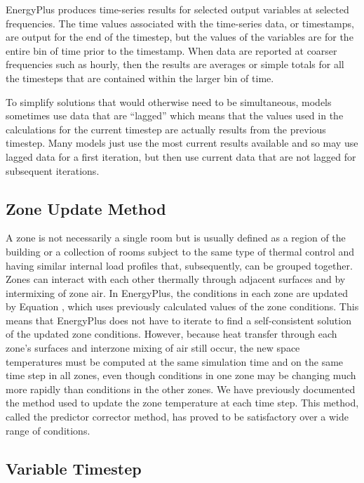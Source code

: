 EnergyPlus produces time-series results for selected output variables at selected frequencies. The time values associated with the time-series data, or timestamps, are output for the end of the timestep, but the values of the variables are for the entire bin of time prior to the timestamp. When data are reported at coarser frequencies such as hourly, then the results are averages or simple totals for all the timesteps that are contained within the larger bin of time.

To simplify solutions that would otherwise need to be simultaneous, models sometimes use data that are ``lagged'' which means that the values used in the calculations for the current timestep are actually results from the previous timestep. Many models just use the most current results available and so may use lagged data for a first iteration, but then use current data that are not lagged for subsequent iterations.

\subsection{Zone Update Method}\label{zone-update-method}

A zone is not necessarily a single room but is usually defined as a region of the building or a collection of rooms subject to the same type of thermal control and having similar internal load profiles that, subsequently, can be grouped together. Zones can interact with each other thermally through adjacent surfaces and by intermixing of zone air. In EnergyPlus, the conditions in each zone are updated by Equation , which uses previously calculated values of the zone conditions. This means that EnergyPlus does not have to iterate to find a self-consistent solution of the updated zone conditions. However, because heat transfer through each zone's surfaces and interzone mixing of air still occur, the new space temperatures must be computed at the same simulation time and on the same time step in all zones, even though conditions in one zone may be changing much more rapidly than conditions in the other zones. We have previously documented the method used to update the zone temperature at each time step. This method, called the predictor corrector method, has proved to be satisfactory over a wide range of conditions.

\subsection{Variable Timestep}\label{variable-timestep}

